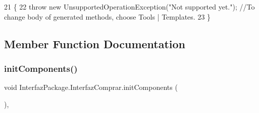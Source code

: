 \begin{DoxyCode}
21                                \{
22         \textcolor{keywordflow}{throw} \textcolor{keyword}{new} UnsupportedOperationException(\textcolor{stringliteral}{"Not supported yet."}); \textcolor{comment}{//To change body of generated
       methods, choose Tools | Templates.}
23     \}
\end{DoxyCode}


\subsection{Member Function Documentation}
\mbox{\label{class_interfaz_package_1_1_interfaz_comprar_a92f8253864e17e07ed47fffaefb88668}} 
\subsubsection{\texorpdfstring{init\+Components()}{initComponents()}}
{\footnotesize\ttfamily void Interfaz\+Package.\+Interfaz\+Comprar.\+init\+Components (\begin{DoxyParamCaption}{ }\end{DoxyParamCaption})\hspace{0.3cm}{\ttfamily [inline]}, {\ttfamily [private]}}

